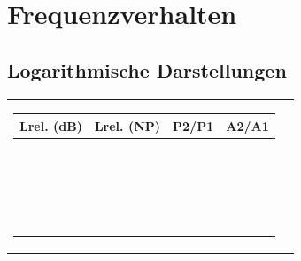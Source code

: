 \section{Frequenzverhalten}
\subsection{Logarithmische Darstellungen}
\begin{tabular}{ll}
\parbox{7cm}{
	\scriptsize
	\begin{tabular}{|c|c|c|c|}
	\hline
	\textbf{Lrel. (dB)} & \textbf{Lrel. (NP)} & \textbf{P2/P1} & \textbf{A2/A1} \\ \hline
	$100.000$ & $11.513$ & $10^{10}$ & $10^5$ \\ \hline
	$90.000$ & $10.362$ & $10^9$ & $31622.777$ \\ \hline
	$80.000$ & $9.210$ & $10^8$ & $10^4$ \\ \hline
	$70.000$ & $8.059$ & $10^7$ & $3162.278$ \\ \hline
	$60.000$ & $6.908$ & $10^6$ & $10^3$ \\ \hline
	$50.000$ & $5.756$ & $10^5$ & $316.228$ \\ \hline
	$40.000$ & $4.605$ & $10^4$ & $10^2$ \\ \hline
	$30.000$ & $3.454$ & $10^3$ & $31.623$ \\ \hline
	\textbf{$20.000$} & $2.303$ & \textbf{$10^2$} & \textbf{$10.000$} \\ \hline
	$19.085$ & $2.197$ & $81.000$ & $9.000$ \\ \hline
	$19.000$ & $2.187$ & $79.433$ & $8.913$ \\ \hline
	$18.062$ & $2.079$ & $64.000$ & $8.000$ \\ \hline
	$18.000$ & $2.072$ & $63.096$ & $7.943$ \\ \hline
	$17.000$ & $1.957$ & $50.119$ & $7.079$ \\ \hline
	$16.902$ & $1.946$ & $49.000$ & $7.000$ \\ \hline
	$16.000$ & $1.842$ & $39.811$ & $6.310$ \\ \hline
	$15.563$ & $1.792$ & $36.000$ & $6.000$ \\ \hline
	$15.000$ & $1.727$ & $31.623$ & $5.623$ \\ \hline
	$14.000$ & $1.612$ & $25.119$ & $5.012$ \\ \hline
	\textbf{$13.979$} & $1.609$ & \textbf{$25.000$} & \textbf{$5.000$} \\ \hline
	$13.000$ & $1.497$ & $19.953$ & $4.467$ \\ \hline

\end{tabular}}
\end{tabular}
